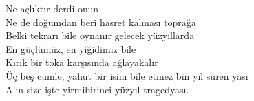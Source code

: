 \noindent\newline
Ne açlıktır derdi onun \\
Ne de doğumdan beri hasret kalması toprağa \\
Belki tekrarı bile oynanır gelecek yüzyıllarda \\
En güçlümüz, en yiğidimiz bile \\
Kırık bir toka karşısında ağlayakalır \\
Üç beş cümle, yahut bir isim bile etmez bin yıl süren yası \\
Alın size işte yirmibirinci yüzyıl tragedyası.